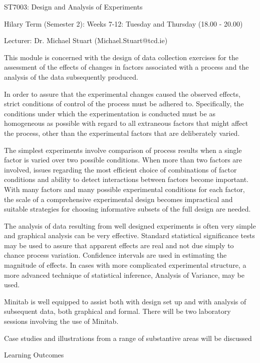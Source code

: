  
 
 
 
ST7003: Design and Analysis of Experiments 

Hilary Term (Semester 2): Weeks 7-12: Tuesday and Thursday (18.00 - 20.00) 

Lecturer: Dr. Michael Stuart (Michael.Stuart@tcd.ie)
 

This module is concerned with the design of data collection exercises for the assessment of the effects of changes in factors associated with a process and the analysis of the data subsequently produced.
 
In order to assure that the experimental changes caused the observed effects, strict conditions of control of the process must be adhered to. Specifically, the conditions under which the experimentation is conducted must be as homogeneous as possible with regard to all extraneous factors that might affect the process, other than the experimental factors that are deliberately varied.
 
The simplest experiments involve comparison of process results when a single factor is varied over two possible conditions.  When more than two factors are involved, issues regarding the most efficient choice of combinations of factor conditions and ability to detect interactions between factors become important.  With many factors and many possible experimental conditions for each factor, the scale of a comprehensive experimental design becomes impractical and suitable strategies for choosing informative subsets of the full design are needed.
 
The analysis of data resulting from well designed experiments is often very simple and graphical analysis can be very effective.  Standard statistical significance tests may be used to assure that apparent effects are real and not due simply to chance process variation.  Confidence intervals are used in estimating the magnitude of effects.  In cases with more complicated experimental structure, a more advanced technique of statistical inference, Analysis of Variance, may be used.
 
Minitab is well equipped to assist both with design set up and with analysis of subsequent data, both graphical and formal.  There will be two laboratory sessions involving the use of Minitab.
 
Case studies and illustrations from a range of substantive areas will be discussed
 
Learning Outcomes
 

